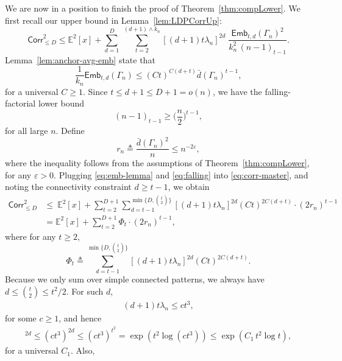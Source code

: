 \documentclass[12pt]{article}
\newcommand{\p}[1]{\left(#1\right)}
\newcommand{\s}[1]{\mathsf{#1}}
\begin{document}
We are now in a position to finish the proof of Theorem~\ref{thm:compLower}. We first recall our upper bound in Lemma~\ref{lem:LDPCorrUp}:
\begin{equation}\label{eq:corr-master}
\s{Corr}_{\leq D}^2
\leq\mathbb{E}^2[x]+
\sum_{d=1}^{D}\ \sum_{t=2}^{(d+1)\wedge k_n}
[(d+1)t\lambda_n]^{2d}\;
\frac{\mathsf{Emb}_{t,d}(\Gamma_n)^{2}}{k_n^{2}\,(n-1)_{t-1}}.
\end{equation}
Lemma~\ref{lem:anchor-avg-emb} state that
\begin{equation}\label{eq:emb-lemma}
\frac{1}{k_n}\mathsf{Emb}_{t,d}(\Gamma_n)\leq(C t)^{C(d+t)}\bar{d}(\Gamma_n)^{t-1},
\end{equation}
for a universal $C\geq1$. Since $t\leq d+1\leq D+1=o(n)$, we have the falling-factorial lower bound
\begin{equation}\label{eq:falling}
(n-1)_{t-1}\geq\Big(\frac{n}{2}\Big)^{t-1},
\end{equation}
for all large $n$. Define
\begin{equation}\label{eq:def-rn}
r_n\triangleq\frac{\bar{d}(\Gamma_n)^2}{n}\leq n^{-2\varepsilon},
\end{equation}
where the inequality follows from the assumptions of Theorem~\ref{thm:compLower}, for any $\varepsilon>0$. Plugging \eqref{eq:emb-lemma} and \eqref{eq:falling} into \eqref{eq:corr-master}, and noting the connectivity constraint $d\ge t-1$, we obtain
\begin{align}
\s{Corr}_{\le D}^2
&\le\ \mathbb{E}^2[x]+\sum_{t=2}^{D+1}\sum_{d=t-1}^{\min\{D,\binom{t}{2}\}}
[(d+1)t\lambda_n]^{2d}(C t)^{2C(d+t)}\cdot(2r_n)^{t-1}\label{eq:after-plug}\\
&=\mathbb{E}^2[x]+\sum_{t=2}^{D+1}\Phi_t\cdot(2r_n)^{t-1},\label{eq:def-Phi}
\end{align}
where for any $t\geq2$,
\begin{equation}\label{eq:Phi}
\Phi_t\triangleq\sum_{d=t-1}^{\min\{D,\binom{t}{2}\}}
[(d+1)t\lambda_n]^{2d}(C t)^{2C(d+t)}.
\end{equation}
Because we only sum over simple connected patterns, we always have $d\le \binom{t}{2}\le t^2/2$.
For such $d$,
\begin{align}
(d+1)t\lambda_n\leq ct^3,
\end{align}
for some $c\geq1$, and hence
\begin{align}
[(d+1)t\lambda_n]^{2d}\leq(ct^3)^{2d}\leq (ct^3)^{t^2}=\exp\p{t^2\log(c t^3)}\leq\exp\p{C_1\,t^2\log t},
\end{align}
for a universal $C_1$. Also,
\end{document}
